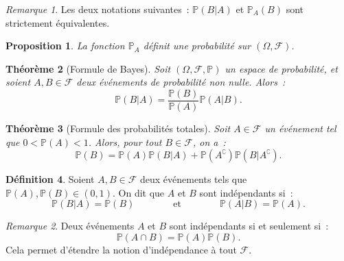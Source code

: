 \documentclass{article}
\renewcommand{\P}{\mathbb P}
\newcommand{\espproba}[3]{\left(#1, #2, #3\right)}  %
\newcommand{\Ofp}{\espproba \Omega{\mathcal F}\P}  %
\newtheorem{thm}{Théorème}[section]
\newtheorem{prp}[thm]{Proposition}
\theoremstyle{definition}
\newtheorem{déf}[thm]{Définition}
\theoremstyle{remark}
\newtheorem*{rmq}{Remarque}
\begin{document}
		\begin{rmq} Les deux notations suivantes~: $\P(B | A)$ et $\P_A(B)$ sont strictement équivalentes. \end{rmq}

		\begin{prp} La fonction $\P_A$ définit une probabilité sur $(\Omega, \mathcal F)$. \end{prp}

		\begin{thm}[Formule de Bayes] Soit $\Ofp$ un espace de probabilité, et soient $A, B \in \mathcal F$ deux événements de probabilité non nulle. Alors~:
		\[\P(B | A) = \frac {\P(B)}{\P(A)}\P(A | B).\]
		\end{thm}

		\begin{thm}[Formule des probabilités totales] Soit $A \in \mathcal F$ un événement tel que $0 < \P(A) < 1$. Alors, pour tout $B \in \mathcal F$, on a~:
		\[\P(B) = \P(A)\P(B|A) + \P(A^\complement)\P(B|A^\complement).\]
		\end{thm}

		\begin{déf} Soient $A, B \in \mathcal F$ deux événements tels que $\P(A), \P(B) \in (0, 1)$. On dit que $A$ et $B$ sont indépendants si~:
		\[\P(B|A) = \P(B)\qquad\qquad\text{et}\qquad\qquad\P(A|B)=\P(A).\]
		\end{déf}

		\begin{rmq} Deux événements $A$ et $B$ sont indépendants si et seulement si~:
		\[\P(A \cap B) = \P(A)\P(B).\]
		Cela permet d'étendre la notion d'indépendance à tout $\mathcal F$. \end{rmq}
\end{document}

